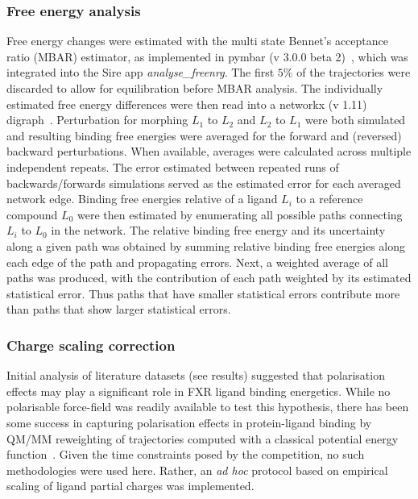 \documentclass{svjour3}                     %
\begin{document}
\subsubsection{Free energy analysis}

Free energy changes were estimated with the multi state Bennet's acceptance ratio (MBAR) estimator, as implemented in pymbar (v 3.0.0 beta 2)~\cite{MBAR}, which was integrated into the Sire app \textit{analyse\_freenrg}. The first $5\%$ of the trajectories were discarded to allow for equilibration before MBAR analysis. The individually estimated free energy differences were then read into a networkx (v 1.11) digraph~\cite{HagbergSchultSwart2008}.
Perturbation for morphing $L_1$ to $L_2$ and $L_2$ to $L_1$ were both simulated and resulting binding free energies were averaged for the forward and (reversed) backward perturbations. When available, averages were calculated across multiple independent repeats. 
The error estimated between repeated runs of backwards/forwards simulations served as the estimated error for each averaged network edge. Binding free energies relative of a ligand $L_i$ to a reference compound $L_0$ were then estimated by enumerating all possible paths connecting $L_i$ to $L_0$ in the network. The relative binding free energy and its uncertainty along a given path was obtained by summing relative binding free energies along each edge of the path and propagating errors. Next, a weighted average of all paths was produced, with the contribution of each path weighted by its estimated statistical error. Thus paths that have smaller statistical errors contribute more than paths that show larger statistical errors.

\subsubsection{Charge scaling correction}
\label{sec:scaling}

Initial analysis of literature datasets (see results) suggested that polarisation effects may play a significant role in FXR ligand binding energetics. While no polarisable force-field was readily available to test this hypothesis, there has been some success in capturing polarisation effects in protein-ligand binding by QM/MM reweighting of trajectories computed with a classical potential energy function~\cite{BeierleinMichelEssex2011}. Given the time constraints posed by the competition, no such methodologies were used here. Rather, an \textit{ad hoc} protocol based on empirical scaling of ligand partial charges was implemented. 
\end{document}
